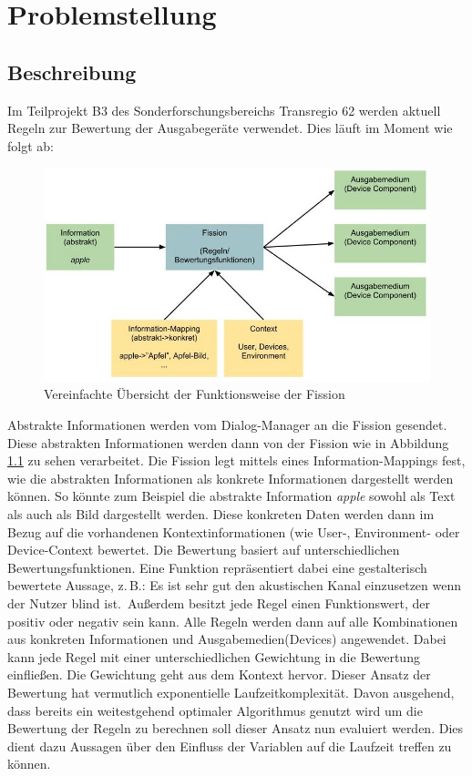 \chapter{Problemstellung}

\section{Beschreibung}

Im Teilprojekt B3 des Sonderforschungsbereichs Transregio 62 werden aktuell Regeln zur Bewertung der Ausgabegeräte verwendet.
Dies läuft im Moment wie folgt ab:
\begin{figure}[ht]
    \centering
    \includegraphics[width=.8\textwidth]{images/FissionUebersicht}
    \caption{\label{fission}Vereinfachte Übersicht der Funktionsweise der Fission}
\end{figure}

 Abstrakte Informationen werden vom Dialog-Manager an die Fission gesendet. Diese abstrakten Informationen werden dann von der Fission wie in Abbildung \ref{fission} zu sehen verarbeitet. Die Fission legt mittels eines Information-Mappings fest, wie die abstrakten Informationen als konkrete Informationen dargestellt werden können. So könnte zum Beispiel die abstrakte Information \emph{apple} sowohl als Text als auch als Bild dargestellt werden. Diese konkreten Daten werden dann im Bezug auf die vorhandenen Kontextinformationen (wie  User-, Environment- oder Device-Context bewertet.
Die Bewertung basiert auf unterschiedlichen Bewertungsfunktionen. Eine Funktion repräsentiert dabei eine gestalterisch bewertete Aussage, z.\,B.: \glqq Es ist sehr gut den akustischen Kanal einzusetzen wenn der Nutzer blind ist.\grqq \ Außerdem besitzt jede Regel einen Funktionswert, der positiv oder negativ sein kann. Alle Regeln werden dann auf alle Kombinationen aus konkreten Informationen und Ausgabemedien(Devices) angewendet. Dabei kann jede Regel mit einer unterschiedlichen Gewichtung in die Bewertung einfließen. Die Gewichtung geht aus dem Kontext hervor.
\linebreak
Dieser Ansatz der Bewertung hat vermutlich exponentielle Laufzeitkomplexität. Davon ausgehend, dass bereits ein weitestgehend optimaler Algorithmus genutzt wird um die Bewertung der Regeln zu berechnen soll dieser Ansatz nun evaluiert werden. Dies dient dazu Aussagen über den Einfluss der Variablen auf die Laufzeit treffen zu können. 
